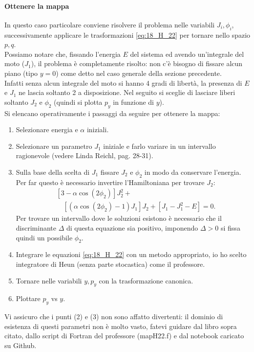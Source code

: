 \paragraph{Ottenere la mappa}%
\label{par:Ottenere la mappa}
In questo caso particolare conviene risolvere il problema nelle variabili $J_i, \phi_i$, successivamente applicare le trasformazioni \ref{eq:18_H_22} per tornare nello spazio $p,q$.\\
Possiamo notare che, fissando l'energia $E$ del sistema ed avendo un'integrale del moto ($J_1$), il problema è completamente risolto: non c'è bisogno di fissare alcun piano (tipo $y=0$) come detto nel caso generale della sezione precedente.\\
Infatti senza alcun integrale del moto si hanno 4 gradi di libertà, la presenza di $E$ e $J_1$ ne lascia soltanto 2 a disposizione. Nel seguito si sceglie di lasciare liberi soltanto $J_{2}$ e $\phi_2$ (quindi si plotta $p_y$ in funzione di $y$).\\
Si elencano operativamente i passaggi da seguire per ottenere la mappa:
\begin{enumerate}
    \item Selezionare energia e $\alpha$ iniziali. 
    \item Selezionare un parametro $J_1$ iniziale e farlo variare in un intervallo ragionevole (vedere Linda Reichl, pag. 28-31).
    \item Sulla base della scelta di $J_1$ fissare $J_2$ e $\phi_2$ in modo da conservare l'energia. Per far questo è necessario invertire l'Hamiltoniana per trovare $J_2$:
	\[\begin{aligned}
	    &\left[3-\alpha\cos (2\phi_2)\right]J_2^2 + \\
	    & \quad \left[\left(\alpha\cos (2\phi_2)-1\right)J_1\right]J_2 + \left[J_1-J_1^2 - E\right] = 0
	.\end{aligned}\]
	Per trovare un intervallo dove le soluzioni esistono è necessario che il discriminante $\Delta$ di questa equazione sia positivo, imponendo $\Delta > 0$ si fissa quindi un possibile $\phi_2$.
    \item Integrare le equazioni \ref{eq:18_H_22} con un metodo appropriato, io ho scelto integratore di Heun (senza parte stocastica) come il professore.
    \item Tornare nelle variabili $y, p_y$ con la trasformazione canonica.
    \item Plottare $p_y$ vs $y$.
\end{enumerate}
Vi assicuro che i punti (2) e (3) non sono affatto divertenti: il dominio di esistenza di questi parametri non è molto vasto, fatevi guidare dal libro sopra citato, dallo script di Fortran del professore (mapH22.f) e dal notebook caricato su Github.\\
